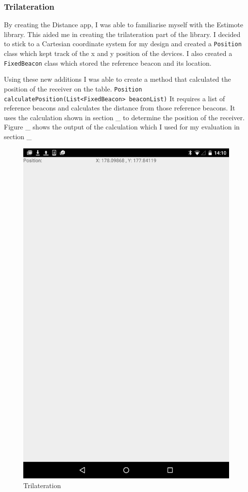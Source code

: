\subsubsection{Trilateration} \label{nocamera_trilateration}

By creating the Distance app, I was able to familiarise myself with the Estimote library. This aided me in creating the trilateration part of the library. I decided to stick to a Cartesian coordinate system for my design and created a \lstinline|Position| class which kept track of the x and y position of the devices. I also created a \lstinline|FixedBeacon| class which stored the reference beacon and its location.

Using these new additions I was able to create a method that calculated the position of the receiver on the table. \lstinline|Position calculatePosition(List<FixedBeacon> beaconList)| It requires a list of reference beacons and calculates the distance from those reference beacons. It uses the calculation shown in section \_ to determine the position of the receiver. 
Figure \_ shows the output of the calculation which I used for my evaluation in section \_
\begin{figure}[h]
  \includegraphics[scale=0.2]{images/trilateration}
  \protect\caption{Trilateration}
  \label{trilateration}
\end{figure}

